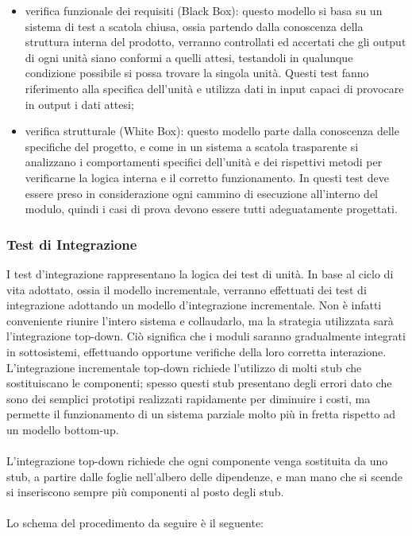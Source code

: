 \begin{itemize}
  \item verifica funzionale dei requisiti (Black Box): questo modello si basa su
  un sistema di test a scatola chiusa, ossia partendo dalla conoscenza della struttura interna del 
prodotto, verranno controllati ed accertati che gli output di ogni unit\`a siano  conformi 
a quelli attesi, testandoli in qualunque condizione possibile si possa trovare la singola 
unit\`a. Questi test fanno riferimento alla specifica dell'unit\`a e utilizza
dati in input capaci di provocare in output i dati attesi;
  \item verifica strutturale (White Box): questo modello parte dalla conoscenza 
  delle specifiche del progetto, e come in un sistema a scatola trasparente si analizzano i 
comportamenti specifici dell'unit\`a e dei rispettivi metodi per verificarne la logica 
interna e il corretto funzionamento. In questi test deve essere preso in considerazione 
ogni cammino di esecuzione all'interno del modulo, quindi i casi di prova devono essere 
tutti adeguatamente progettati. 
\end{itemize}


\subsubsection*{Test di Integrazione}
I test d'integrazione rappresentano la logica dei test di unit\`a.
In base al ciclo di vita adottato, ossia il modello incrementale, verranno effettuati dei 
test di integrazione adottando un modello d'integrazione incrementale. 
Non \`e infatti conveniente riunire l'intero sistema e collaudarlo, ma la
strategia utilizzata sar\`a l'integrazione top-down. Ci\`o significa che i
moduli saranno gradualmente integrati in sottosistemi, effettuando opportune verifiche della loro  corretta interazione. 
L'integrazione incrementale top-down richiede l'utilizzo di molti stub che
sostituiscano le componenti; spesso questi stub presentano degli errori dato che sono dei semplici 
prototipi realizzati rapidamente per diminuire i costi, ma permette il funzionamento di 
un sistema parziale molto pi\`u in fretta rispetto ad un modello bottom-up.\\
\\
L'integrazione top-down richiede che ogni componente venga sostituita da uno
stub, a partire dalle foglie nell'albero delle dipendenze, e man mano che si scende si 
inseriscono sempre pi\`u componenti al posto degli stub. \\ \\
Lo schema del procedimento da seguire \`e il seguente:

